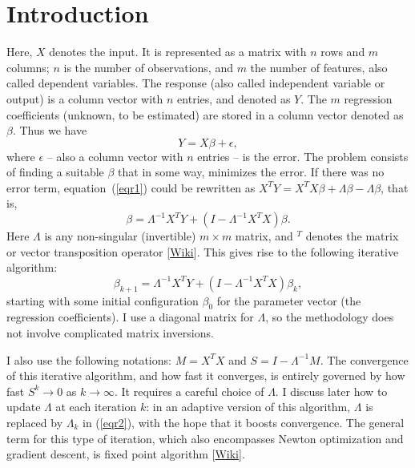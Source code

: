 \documentclass[oneside,10pt]{book}
\begin{document}
\hypersetup{linkcolor=red}

\section{Introduction}\label{regi1}

Here, $X$ denotes the input. It is represented as a matrix with $n$ rows and $m$ columns; $n$ is the number of observations, and $m$ the number of
features, also called dependent variables. The response (also called independent variable or output) is a column vector with $n$ entries, and denoted as $Y$. The $m$ regression coefficients (unknown, to be estimated) are stored in a column vector denoted as $\beta$. Thus we have
\begin{equation}
Y=X\beta +\epsilon, \label{eqr1}
\end{equation}
where $\epsilon$ -- also a column vector with $n$ entries -- is the error. The problem consists of finding a suitable $\beta$ that in some way, minimizes the error. If there was no error term, equation~(\ref{eqr1}) could be rewritten as $X^TY=X^T X\beta + \Lambda\beta - \Lambda\beta$, that is,
$$\beta=\Lambda^{-1}X^TY +(I-\Lambda^{-1}X^TX)\beta.$$
Here $\Lambda$ is any non-singular (invertible) $m\times m$ matrix, and $ ^T$ denotes the matrix or vector transposition operator [\href{https://en.wikipedia.org/wiki/Transpose}{Wiki}]. This gives rise to the following iterative algorithm:
\begin{equation}
\beta_{k+1}=\Lambda^{-1}X^TY +(I-\Lambda^{-1}X^TX)\beta_k,\label{eqr2}
\end{equation}
starting with some initial configuration $\beta_0$ for the parameter vector (the regression coefficients). I use a diagonal matrix for $\Lambda$, so the methodology does not involve complicated matrix inversions.

I also use the following notations: $M=X^TX$ and $S=I-\Lambda^{-1}M$. The convergence of this iterative algorithm, and how fast it converges, is entirely governed by
how fast $S^k\rightarrow 0$ as $k\rightarrow\infty$. It requires a careful choice of $\Lambda$. I discuss later how to update $\Lambda$ at each iteration $k$: in an adaptive version of this algorithm, $\Lambda$ is replaced by $\Lambda_k$ in (\ref{eqr2}), with the hope that it boosts convergence. The general term for this type of iteration, which also encompasses Newton optimization and gradient descent, is \textcolor{index}{fixed point algorithm} [\href{https://en.wikipedia.org/wiki/Fixed-point_iteration}{Wiki}].
\end{document}
